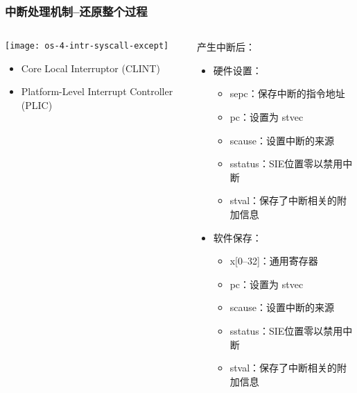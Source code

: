 \begin{frame}[plain,t]
	\frametitle{中断处理机制--还原整个过程}
	\begin{columns}
		
		\begin{column}{0.4\textwidth}
			\centering
			\texttt{[image: os-4-intr-syscall-except]}
			\begin{itemize} \small
				\item Core Local	Interruptor (CLINT)
				\item Platform-Level Interrupt Controller (PLIC)
			\end{itemize}
			
		\end{column}
		
		\begin{column}{0.5\textwidth}
			
			\centering
			产生中断后：
			\begin{itemize} \small 
				\item 硬件设置：\pause
				\begin{itemize} \small 
					\item sepc：保存中断的指令地址	
					\item pc：设置为 stvec
					\item scause：设置中断的来源
					\item sstatus：SIE位置零以禁用中断					
					\item stval：保存了中断相关的附加信息
			   \end{itemize}	
				\item 软件保存：\pause
				\begin{itemize} \small 
					\item x[0--32]：通用寄存器 	
					\item pc：设置为 stvec
					\item scause：设置中断的来源
					\item sstatus：SIE位置零以禁用中断					
					\item stval：保存了中断相关的附加信息
				\end{itemize}											
			\end{itemize}
			
		\end{column}
		
	\end{columns}
	
\end{frame}	




